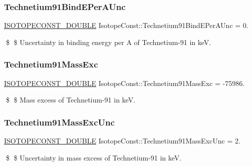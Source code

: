 \subsubsection{\texorpdfstring{Technetium91\+Bind\+E\+Per\+A\+Unc}{Technetium91BindEPerAUnc}}
{\footnotesize\ttfamily \mbox{\hyperlink{group___isotope_const-_macros_ga8f45a7272ce02c0b4c65c44636ed719a}{I\+S\+O\+T\+O\+P\+E\+C\+O\+N\+S\+T\+\_\+\+D\+O\+U\+B\+LE}} Isotope\+Const\+::\+Technetium91\+Bind\+E\+Per\+A\+Unc = 0.}

\$ \$ Uncertainty in binding energy per A of Technetium-\/91 in keV. \mbox{\label{group___isotope_const-_technetium-_tc91_ga5ab1d695aa80f9b0fce07e9d881211a4}} 
\subsubsection{\texorpdfstring{Technetium91\+Mass\+Exc}{Technetium91MassExc}}
{\footnotesize\ttfamily \mbox{\hyperlink{group___isotope_const-_macros_ga8f45a7272ce02c0b4c65c44636ed719a}{I\+S\+O\+T\+O\+P\+E\+C\+O\+N\+S\+T\+\_\+\+D\+O\+U\+B\+LE}} Isotope\+Const\+::\+Technetium91\+Mass\+Exc = -\/75986.}

\$ \$ Mass excess of Technetium-\/91 in keV. \mbox{\label{group___isotope_const-_technetium-_tc91_gad19fa8c2c7128ba0a928ebe2cf96e943}} 
\subsubsection{\texorpdfstring{Technetium91\+Mass\+Exc\+Unc}{Technetium91MassExcUnc}}
{\footnotesize\ttfamily \mbox{\hyperlink{group___isotope_const-_macros_ga8f45a7272ce02c0b4c65c44636ed719a}{I\+S\+O\+T\+O\+P\+E\+C\+O\+N\+S\+T\+\_\+\+D\+O\+U\+B\+LE}} Isotope\+Const\+::\+Technetium91\+Mass\+Exc\+Unc = 2.}

\$ \$ Uncertainty in mass excess of Technetium-\/91 in keV. \mbox{\label{group___isotope_const-_technetium-_tc91_gabf69290355416cf5646af8478daaaf78}} 
